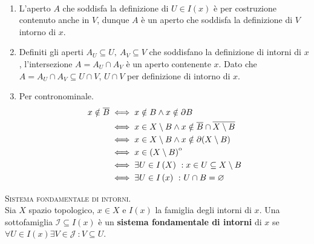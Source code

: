 \begin{demonstration}~{}
\begin{enumerate}[label=\Roman*]
\item L'aperto $A$ che soddisfa la definizione di $U\in I\left(x\right)$ è per costruzione contenuto anche in $V$, dunque $A$ è un aperto che soddisfa la definizione di $V$ intorno di $x$.
\item Definiti gli aperti $A_U\subseteq U,\ A_V\subseteq V$ che soddisfano la definizione di intorni di $x$, l'intersezione $A=A_U\cap A_V$ è un aperto contenente $x$. Dato che $A=A_U\cap A_V\subseteq U\cap V$, $U\cap V$ per definizione di intorno di $x$.
\item Per contronominale. \begin{align*}
	x\notin \overline{B} &\iff x\notin B \wedge x\notin \partial B\\
	&\iff x\in X\setminus B \wedge x\notin \overline{B}\cap\overline{X\setminus B}\\
	& \iff x\in X\setminus B \wedge x\notin \partial (X\setminus B)\\
	& \iff x\in {\kern0pt\left(X\setminus B\right)}^{\mathrm{o}}\\
	& \iff \exists U\in I\left(X\right)\ : x\in U\subseteq X\setminus B\\
	&\iff \exists U\in I\left(x\right)\ \colon U\cap B=\varnothing
\end{align*} 
\end{enumerate}
\vspace{-6mm}
\end{demonstration}
\begin{define}\textsc{Sistema fondamentale di intorni.}\\
Sia $X$ spazio topologico, $x\in X$ e $I\left(x\right)$ la famiglia degli intorni di $x$. Una sottofamiglia $\mathcal{I}\subseteq I\left(x\right)$ è un \textbf{sistema fondamentale di intorni} di $x$ se $\forall U\in I\left(x\right)\exists V\in\mathcal{J}\ \colon V\subseteq U$.
\end{define}
